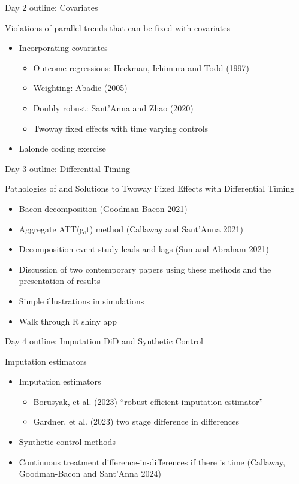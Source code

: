 \documentclass{beamer}
\begin{document}
\begin{frame}{Day 2 outline: Covariates}

Violations of parallel trends that can be fixed with covariates
	\begin{itemize}
	\item Incorporating covariates
		\begin{itemize}
		\item Outcome regressions: Heckman, Ichimura and Todd (1997)
		\item Weighting: Abadie (2005)
		\item Doubly robust: Sant’Anna and Zhao (2020)
		\item Twoway fixed effects with time varying controls	
		\end{itemize}
	\item Lalonde coding exercise
	\end{itemize}

\end{frame}

\begin{frame}{Day 3 outline: Differential Timing}

Pathologies of and Solutions to Twoway Fixed Effects with Differential Timing
	\begin{itemize}
	\item Bacon decomposition (Goodman-Bacon 2021)
	\item Aggregate ATT(g,t) method (Callaway and Sant’Anna 2021)
	\item Decomposition event study leads and lags (Sun and Abraham 2021)
	\item Discussion of two contemporary papers using these methods and the presentation of results
	\item Simple illustrations in simulations
	\item Walk through R shiny app
	\end{itemize}

\end{frame}


\begin{frame}{Day 4 outline: Imputation DiD and Synthetic Control}

Imputation estimators

\begin{itemize}
\item Imputation estimators
		\begin{itemize}
		\item Borusyak, et al. (2023) “robust efficient imputation estimator”
		\item Gardner, et al. (2023) two stage difference in differences
		\end{itemize}
\item Synthetic control methods
\item Continuous treatment difference-in-differences if there is time (Callaway, Goodman-Bacon and Sant'Anna 2024)
\end{itemize}

\end{frame}
\end{document}

